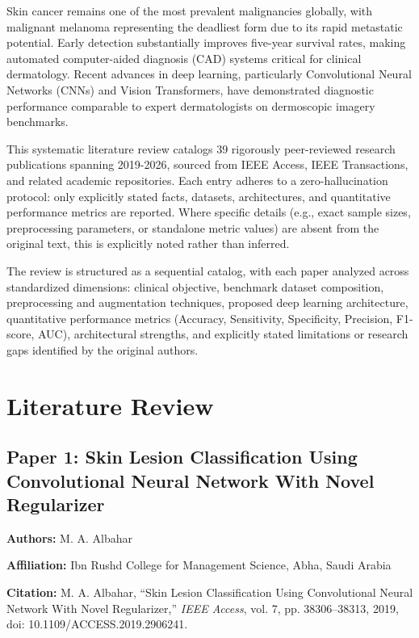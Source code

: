 \documentclass[conference]{IEEEtran}
\begin{document}
Skin cancer remains one of the most prevalent malignancies globally, with malignant melanoma representing the deadliest form due to its rapid metastatic potential. Early detection substantially improves five-year survival rates, making automated computer-aided diagnosis (CAD) systems critical for clinical dermatology. Recent advances in deep learning, particularly Convolutional Neural Networks (CNNs) and Vision Transformers, have demonstrated diagnostic performance comparable to expert dermatologists on dermoscopic imagery benchmarks.

This systematic literature review catalogs 39 rigorously peer-reviewed research publications spanning 2019-2026, sourced from IEEE Access, IEEE Transactions, and related academic repositories. Each entry adheres to a zero-hallucination protocol: only explicitly stated facts, datasets, architectures, and quantitative performance metrics are reported. Where specific details (e.g., exact sample sizes, preprocessing parameters, or standalone metric values) are absent from the original text, this is explicitly noted rather than inferred.

The review is structured as a sequential catalog, with each paper analyzed across standardized dimensions: clinical objective, benchmark dataset composition, preprocessing and augmentation techniques, proposed deep learning architecture, quantitative performance metrics (Accuracy, Sensitivity, Specificity, Precision, F1-score, AUC), architectural strengths, and explicitly stated limitations or research gaps identified by the original authors.

\section{Literature Review}

\subsection{Paper 1: Skin Lesion Classification Using Convolutional Neural Network With Novel Regularizer}

\textbf{Authors:} M. A. Albahar

\textbf{Affiliation:} Ibn Rushd College for Management Science, Abha, Saudi Arabia

\textbf{Citation:} M. A. Albahar, ``Skin Lesion Classification Using Convolutional Neural Network With Novel Regularizer,'' \textit{IEEE Access}, vol. 7, pp. 38306--38313, 2019, doi: 10.1109/ACCESS.2019.2906241.
\end{document}
